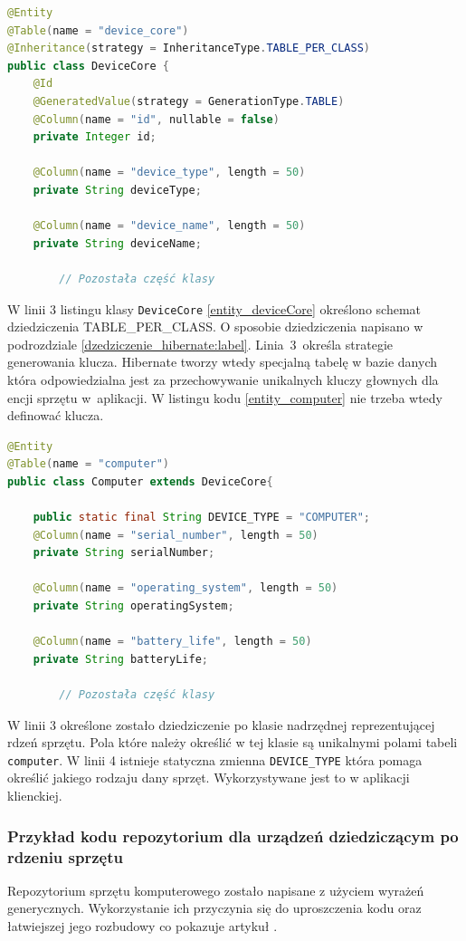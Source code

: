 \begin{lstlisting}[language=Java, style=JavaStyle, caption={Klasa nadrzędna reprezentująca rdzeń sprzętu: DeviceCore}, label={entity_deviceCore}]
@Entity
@Table(name = "device_core")
@Inheritance(strategy = InheritanceType.TABLE_PER_CLASS)
public class DeviceCore {
    @Id
    @GeneratedValue(strategy = GenerationType.TABLE)
    @Column(name = "id", nullable = false)
    private Integer id;

    @Column(name = "device_type", length = 50)
    private String deviceType;

    @Column(name = "device_name", length = 50)
    private String deviceName;
		
		// Pozostała część klasy

\end{lstlisting}
W linii 3 listingu klasy \texttt{DeviceCore} \ref{entity_deviceCore} określono schemat dziedziczenia \mbox{TABLE\_PER\_CLASS.} O sposobie dziedziczenia napisano w podrozdziale \ref{dzedziczenie_hibernate:label}. Linia~3~określa strategie generowania klucza. Hibernate tworzy wtedy specjalną tabelę w bazie danych która odpowiedzialna jest za przechowywanie unikalnych kluczy głownych dla encji sprzętu w~aplikacji. W listingu kodu \ref{entity_computer} nie trzeba wtedy definować klucza.

\begin{lstlisting}[language=Java, style=JavaStyle,  caption={Klasa potomna: Computer, reprezentująca komputer}, label={entity_computer}]
@Entity
@Table(name = "computer")
public class Computer extends DeviceCore{

    public static final String DEVICE_TYPE = "COMPUTER";
    @Column(name = "serial_number", length = 50)
    private String serialNumber;

    @Column(name = "operating_system", length = 50)
    private String operatingSystem;

    @Column(name = "battery_life", length = 50)
    private String batteryLife;
		
		// Pozostała część klasy
\end{lstlisting}
W linii 3 określone zostało dziedziczenie po klasie nadrzędnej reprezentującej rdzeń sprzętu. Pola które należy określić w tej klasie są unikalnymi polami tabeli \texttt{computer}. W linii 4 istnieje statyczna zmienna \texttt{DEVICE\_TYPE} która pomaga określić jakiego rodzaju dany sprzęt. Wykorzystywane jest to w aplikacji klienckiej.


\subsubsection{Przykład kodu repozytorium dla urządzeń dziedziczącym po rdzeniu sprzętu}
Repozytorium sprzętu komputerowego zostało napisane z użyciem wyrażeń generycznych. Wykorzystanie ich przyczynia się do uproszczenia kodu oraz łatwiejszej jego rozbudowy co pokazuje artykuł \cite{generics}.
\newline

